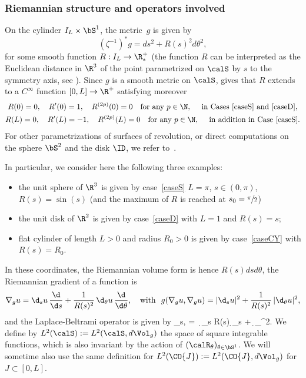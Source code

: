 \subsubsection*{Riemannian structure and operators involved}
On the cylinder $I_L\times \bS^1$, the metric~$g$ is given by
\begin{equation}
\label{e:metric-revol}
(\zeta^{-1})^*g = ds^2 + R(s)^2 d\theta^2,
\end{equation}
for some smooth function $R : I_L \to \R^+_*$ (the function $R$ can be interpreted as the Euclidean distance in $\R^3$ of the point parametrized on $\calS$ by $s$ to the symmetry axis, see \eg \cite[\S 3]{LL:18}). Since $g$ is a smooth metric on $\calS$, \cite[Prop.\,4.6]{Besse} gives that $R$ extends to a $C^\infty$ function $[0,L] \to \R^+$ satisfying moreover
\begin{gather}
\label{e:condR}
R(0) = 0, \quad R'(0) = 1, \quad R^{(2p)}(0) =0 \quad \text{for any } p \in \N, \quad \text{ in Cases~\ref{caseS} and~\ref{caseD}}, \\
R(L) = 0,\quad R'(L) = -1, \quad R^{(2p)}(L)=0 \quad \text{for any } p \in \N, \quad \text{ in addition in Case~\ref{caseS}}. \nonumber
\end{gather}
For other parametrizations of surfaces of revolution, or direct computations on the sphere $\bS^2$ and the disk $\ID$, we refer to~\cite[\S 3]{LL:18}.

\begin{example}
In particular, we consider here the following three examples:
\begin{itemize}
\item the unit sphere of $\R^3$ is given by case~\ref{caseS} $L=\pi$, $s\in (0,\pi)$, $R(s) = \sin(s)$ (and the maximum of $R$ is reached at $s_0= \sfrac{\pi}{2}$)
\item the unit disk of $\R^2$ is given by case~\ref{caseD} with $L=1$ and $R(s)=s$;
\item flat cylinder of length $L>0$ and radius $R_0>0$ is given by case~\ref{caseCY} with $R(s)= R_0$.
\end{itemize}
\end{example}
In these coordinates, the Riemannian volume form is hence $R(s) ds d\theta$, the Riemannian gradient of a function is
\begin{equation}
\label{e:reim-gradient}
\nabla_g u = \d_s u \,\frac{\d}{\d s} + \frac{1}{R(s)^2}\, \d_\theta u \,\frac{\d}{\d\theta}, \quad \text{with }\ g(\nabla_g u, \nabla_g u ) = |\d_s u|^2 + \frac{1}{R(s)^2}\, |\d_\theta u|^2,
\end{equation}
and the Laplace-Beltrami operator is given by
\bal
\Delta_{s,\theta} = \, \d_s R(s) \d_s +  \,\d_\theta^2.
\nal
We define by $L^2(\calS) := L^2(\calS, d\Vol_g)$ the space of square integrable functions, which is also invariant by the action of $(\calR_\theta)_{\theta \in \bS^1}$. We will sometime also use the same definition for $L^2(\CO{J}) := L^2(\CO{J}, d\Vol_g)$ for $J\subset [0,L]$.

